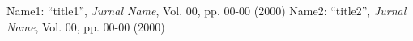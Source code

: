 \documentclass[11pt,a4j,report]{jsbook}%
\newcommand{\1}{\mbox{1}\hspace{-0.25em}\mbox{l}}%
\begin{document}
\begin{thebibliography}{99}
  Name1: ``title1'', {\em Jurnal Name}, Vol. 00, pp. 00-00 (2000)
  Name2: ``title2'', {\em Jurnal Name}, Vol. 00, pp. 00-00 (2000)
\end{thebibliography}


%
\end{document}
